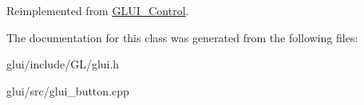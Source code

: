 Reimplemented from \hyperlink{classGLUI__Control}{G\-L\-U\-I\-\_\-\-Control}.



The documentation for this class was generated from the following files\-:\begin{DoxyCompactItemize}
\item 
glui/include/\-G\-L/glui.\-h\item 
glui/src/glui\-\_\-button.\-cpp\end{DoxyCompactItemize}
